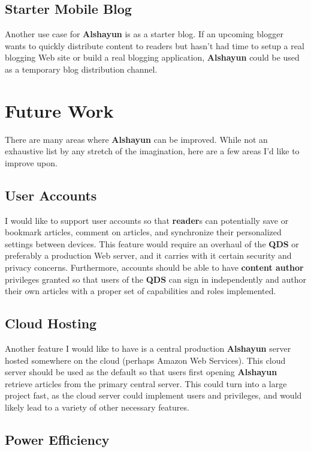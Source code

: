 \documentclass[12pt]{report}
\begin{document}
    \section{Starter Mobile Blog}

Another use case for \textbf{Alshayun} is as a starter blog. If an upcoming
blogger wants to quickly distribute content to readers but hasn't had time to
setup a real blogging Web site or build a real blogging application,
\textbf{Alshayun} could be used as a temporary blog distribution channel.

\chapter{Future Work}

There are many areas where \textbf{Alshayun} can be improved. While not an
exhaustive list by any stretch of the imagination, here are a few areas I'd like
to improve upon.

    \section{User Accounts}

I would like to support user accounts so that \textbf{reader}s can potentially
save or bookmark articles, comment on articles, and synchronize their
personalized settings between devices. This feature would require an overhaul of
the \textbf{QDS} or preferably a production Web server, and it carries with it
certain security and privacy concerns. Furthermore, accounts should be able to
have \textbf{content author} privileges granted so that users of the
\textbf{QDS} can sign in independently and author their own articles with a
proper set of capabilities and roles implemented.

    \section{Cloud Hosting}

Another feature I would like to have is a central production \textbf{Alshayun}
server hosted somewhere on the cloud (perhaps Amazon Web Services). This cloud
server should be used as the default so that users first opening
\textbf{Alshayun} retrieve articles from the primary central server. This could
turn into a large project fast, as the cloud server could implement users and
privileges, and would likely lead to a variety of other necessary features.

    \section{Power Efficiency}
\end{document}
